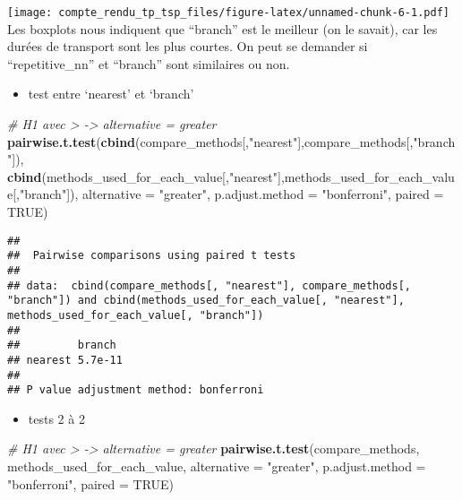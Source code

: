 \documentclass[
]{article}
\newenvironment{Shaded}{\begin{snugshade}}{\end{snugshade}}
\newcommand{\CommentTok}[1]{\textcolor[rgb]{0.56,0.35,0.01}{\textit{#1}}}
\newcommand{\DataTypeTok}[1]{\textcolor[rgb]{0.13,0.29,0.53}{#1}}
\newcommand{\KeywordTok}[1]{\textcolor[rgb]{0.13,0.29,0.53}{\textbf{#1}}}
\newcommand{\NormalTok}[1]{#1}
\newcommand{\OtherTok}[1]{\textcolor[rgb]{0.56,0.35,0.01}{#1}}
\newcommand{\StringTok}[1]{\textcolor[rgb]{0.31,0.60,0.02}{#1}}
\providecommand{\tightlist}{%
  \setlength{\itemsep}{0pt}\setlength{\parskip}{0pt}}
\begin{document}
\texttt{[image: compte\_rendu\_tp\_tsp\_files/figure-latex/unnamed-chunk-6-1.pdf]}
Les boxplots nous indiquent que ``branch'' est le meilleur (on le
savait), car les durées de transport sont les plus courtes. On peut se
demander si ``repetitive\_nn'' et ``branch'' sont similaires ou non.

\begin{itemize}
\tightlist
\item
  test entre `nearest' et `branch'
\end{itemize}

\begin{Shaded}
\begin{Highlighting}[]
\CommentTok{# H1 avec > -> alternative = greater}
\KeywordTok{pairwise.t.test}\NormalTok{(}\KeywordTok{cbind}\NormalTok{(compare_methods[,}\StringTok{"nearest"}\NormalTok{],compare_methods[,}\StringTok{"branch"}\NormalTok{]), }\KeywordTok{cbind}\NormalTok{(methods_used_for_each_value[,}\StringTok{"nearest"}\NormalTok{],methods_used_for_each_value[,}\StringTok{"branch"}\NormalTok{]), }\DataTypeTok{alternative =} \StringTok{"greater"}\NormalTok{, }\DataTypeTok{p.adjust.method =} \StringTok{"bonferroni"}\NormalTok{, }\DataTypeTok{paired =} \OtherTok{TRUE}\NormalTok{)}
\end{Highlighting}
\end{Shaded}

\begin{verbatim}
## 
##  Pairwise comparisons using paired t tests 
## 
## data:  cbind(compare_methods[, "nearest"], compare_methods[, "branch"]) and cbind(methods_used_for_each_value[, "nearest"], methods_used_for_each_value[, "branch"]) 
## 
##         branch 
## nearest 5.7e-11
## 
## P value adjustment method: bonferroni
\end{verbatim}

\begin{itemize}
\tightlist
\item
  tests 2 à 2
\end{itemize}

\begin{Shaded}
\begin{Highlighting}[]
\CommentTok{# H1 avec > -> alternative = greater}
\KeywordTok{pairwise.t.test}\NormalTok{(compare_methods, methods_used_for_each_value, }\DataTypeTok{alternative =} \StringTok{"greater"}\NormalTok{, }\DataTypeTok{p.adjust.method =} \StringTok{"bonferroni"}\NormalTok{, }\DataTypeTok{paired =} \OtherTok{TRUE}\NormalTok{)}
\end{Highlighting}
\end{Shaded}
\end{document}
